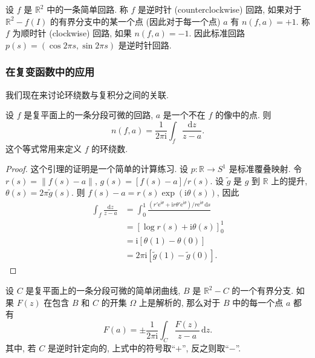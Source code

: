 \begin{definition}\label{ch10:def-orientation}
设 $f$ 是 $\mathbb{R}^{2}$ 中的一条简单回路. 称 $f$ 是逆时针 (counterclockwise) 回路, 如果对于 $\mathbb{R}^{2}-f(I)$ 的有界分支中的某一个点 (因此对于每一个点) $a$ 有 $n(f,a)=+1$. 称 $f$ 为顺时针 (clockwise) 回路, 如果 $n(f,a)=-1$. 因此标准回路 $p(s)=(\cos 2\pi s,\sin 2\pi s)$ 是逆时针回路.
\end{definition}

\subsubsection*{在复变函数中的应用}

我们现在来讨论环绕数与复积分之间的关联.

\begin{lemma}\label{ch10:lemma-winding-integral}
设 $f$ 是复平面上的一条分段可微的回路, $a$ 是一个不在 $f$ 的像中的点. 则
\[
n(f,a)=\frac{1}{2\pi\mathrm{i}}\int_{f}\frac{\mathrm{d}z}{z-a}.
\]
这个等式常用来定义 $f$ 的环绕数.
\end{lemma}

\begin{proof}
这个引理的证明是一个简单的计算练习. 设 $p\colon\mathbb{R}\to S^{1}$ 是标准覆叠映射. 令 $r(s)=\|f(s)-a\|$, $g(s)=[f(s)-a]/r(s)$. 设 $\widetilde{g}$ 是 $g$ 到 $\mathbb{R}$ 上的提升, $\theta(s)=2\pi\widetilde{g}(s)$. 则 $f(s)-a=r(s)\exp(\mathrm{i}\theta(s))$, 因此
\[
\begin{aligned}
\int_{f}\frac{\mathrm{d}z}{z-a}
&=\int_{0}^{1}\frac{(r'\mathrm{e}^{\mathrm{i}\theta}+\mathrm{i}r\theta'\mathrm{e}^{\mathrm{i}\theta})/r\mathrm{e}^{\mathrm{i}\theta}\,\mathrm{d}s}{}\\
&=[\log r(s)+\mathrm{i}\theta(s)]_{0}^{1}\\
&=\mathrm{i}[\theta(1)-\theta(0)]\\
&=2\pi\mathrm{i}[\widetilde{g}(1)-\widetilde{g}(0)].
\end{aligned}
\]
\end{proof}

\begin{theorem}\label{ch10:thm-cauchy-classical}
设 $C$ 是复平面上的一条分段可微的简单闭曲线, $B$ 是 $\mathbb{R}^{2}-C$ 的一个有界分支. 如果 $F(z)$ 在包含 $B$ 和 $C$ 的开集 $\Omega$ 上是解析的, 那么对于 $B$ 中的每一个点 $a$ 都有
\[
F(a)=\pm\frac{1}{2\pi\mathrm{i}}\int_{C}\frac{F(z)}{z-a}\,\mathrm{d}z.
\]
其中, 若 $C$ 是逆时针定向的, 上式中的符号取``$+$'', 反之则取``$-$''.
\end{theorem}

